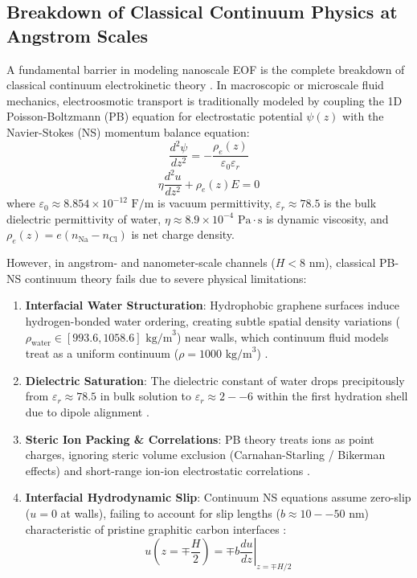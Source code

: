 \documentclass[3p,preprint,12pt,numbers,square,sort&compress]{elsarticle}
\begin{document}
\subsection{Breakdown of Classical Continuum Physics at Angstrom Scales}
A fundamental barrier in modeling nanoscale EOF is the complete breakdown of classical continuum electrokinetic theory \cite{karniadakis2021, cai2021}. In macroscopic or microscale fluid mechanics, electroosmotic transport is traditionally modeled by coupling the 1D Poisson-Boltzmann (PB) equation for electrostatic potential $\psi(z)$ with the Navier-Stokes (NS) momentum balance equation:
\begin{equation}
    \frac{d^2 \psi}{d z^2} = -\frac{\rho_e(z)}{\varepsilon_0 \varepsilon_r}
    \label{eq:pb}
\end{equation}
\begin{equation}
    \eta \frac{d^2 u}{d z^2} + \rho_e(z) E = 0
    \label{eq:ns}
\end{equation}
where $\varepsilon_0 \approx 8.854 \times 10^{-12}\text{ F/m}$ is vacuum permittivity, $\varepsilon_r \approx 78.5$ is the bulk dielectric permittivity of water, $\eta \approx 8.9 \times 10^{-4}\text{ Pa}\cdot\text{s}$ is dynamic viscosity, and $\rho_e(z) = e(n_{\text{Na}} - n_{\text{Cl}})$ is net charge density.

However, in angstrom- and nanometer-scale channels ($H < 8\text{ nm}$), classical PB-NS continuum theory fails due to severe physical limitations:
\begin{enumerate}
    \item \textbf{Interfacial Water Structuration}: Hydrophobic graphene surfaces induce hydrogen-bonded water ordering, creating subtle spatial density variations ($\rho_{\text{water}} \in [993.6, 1058.6]\text{ kg/m}^3$) near walls, which continuum fluid models treat as a uniform continuum ($\rho = 1000\text{ kg/m}^3$) \cite{vinuesa2023}.
    \item \textbf{Dielectric Saturation}: The dielectric constant of water drops precipitously from $\varepsilon_r \approx 78.5$ in bulk solution to $\varepsilon_r \approx 2--6$ within the first hydration shell due to dipole alignment \cite{li2025}.
    \item \textbf{Steric Ion Packing \& Correlations}: PB theory treats ions as point charges, ignoring steric volume exclusion (Carnahan-Starling / Bikerman effects) and short-range ion-ion electrostatic correlations \cite{fu2025}.
    \item \textbf{Interfacial Hydrodynamic Slip}: Continuum NS equations assume zero-slip ($u = 0$ at walls), failing to account for slip lengths ($b \approx 10--50\text{ nm}$) characteristic of pristine graphitic carbon interfaces \cite{arya2026}:
    \begin{equation}
        u\left(z = \mp \frac{H}{2}\right) = \mp b \left. \frac{du}{dz} \right|_{z = \mp H/2}
        \label{eq:slip}
    \end{equation}
\end{enumerate}
\end{document}
